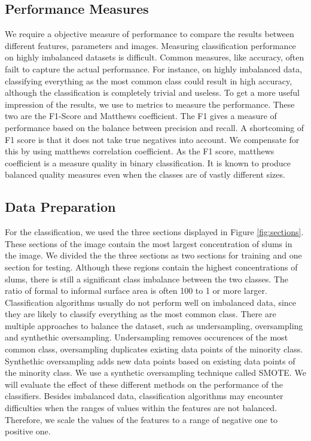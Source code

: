 \subsection{Performance Measures}
We require a objective measure of performance to compare the results between different features, parameters and images. Measuring classification performance on highly imbalanced datasets is difficult. Common measures, like accuracy, often failt to capture the actual performance. For instance, on highly imbalanced data, classifying everything as the most common class could result in high accuracy, although the classification is completely trivial and useless. To get a more useful impression of the results, we use to metrics to measure the performance. These two are the F1-Score and Matthews coefficient. The F1 gives a measure of performance based on the balance between precision and recall. A shortcoming of F1 score is that it does not take true negatives into account. We compensate for this by using matthews correlation coefficient. As the F1 score, matthews coefficient is a measure quality in binary classification. It is known to produce balanced quality measures even when the classes are of vastly different sizes.

\subsection{Data Preparation}

For the classification, we used the three sections displayed in Figure \ref{fig:sections}. These sections of the image contain the most largest concentration of slums in the image. We divided the the three sections as two sections for training and one section for testing. Although these regions contain the highest concentrations of slums, there is still a significant class imbalance between the two classes. The ratio of formal to informal surface area is often 100 to 1 or more larger. Classification algorithms usually do not perform well on imbalanced data, since they are likely to classify everything as the most common class. There are multiple approaches to balance the dataset, such as undersampling, oversampling and synthethic oversampling. Undersampling removes occurences of the most common class, oversampling duplicates existing data points of the minority class. Synthethic oversampling adds new data points based on existing data points of the minority class. We use a synthetic oversampling technique called SMOTE. We will evaluate the effect of these different methods on the performance of the classifiers. Besides imbalanced data, classification algorithms may encounter difficulties when the ranges of values within the features are not balanced. Therefore, we scale the values of the features to a range of negative one to positive one.

